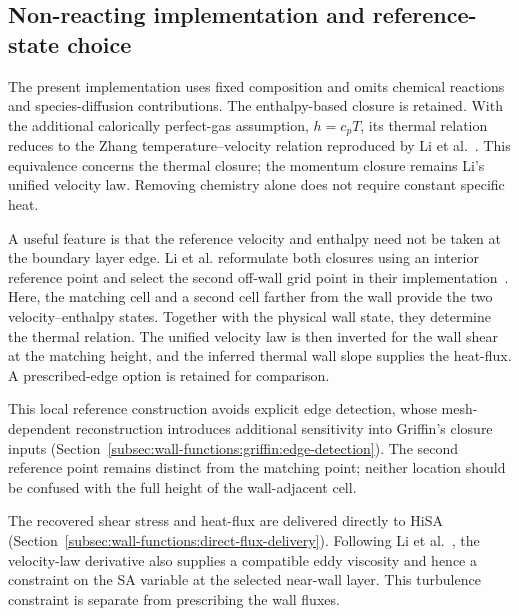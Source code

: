 \subsection{Non-reacting implementation and reference-state choice}
\label{subsec:wall-functions:gao-li:openfoam-implementation}

The present implementation uses fixed composition and omits chemical reactions and species-diffusion contributions. The enthalpy-based closure is retained. With the additional calorically perfect-gas assumption, \(h=c_pT\), its thermal relation reduces to the Zhang temperature--velocity relation reproduced by Li et al.~\cite[Eqs.~(8)--(13)]{li2025WF}. This equivalence concerns the thermal closure; the momentum closure remains Li's unified velocity law. Removing chemistry alone does not require constant specific heat.
\par\medskip

A useful feature is that the reference velocity and enthalpy need not be taken at the boundary layer edge. Li et al. reformulate both closures using an interior reference point and select the second off-wall grid point in their implementation~\cite[Section~IV.C, Eqs.~(40)--(42)]{li2025WF}. Here, the matching cell and a second cell farther from the wall provide the two velocity--enthalpy states. Together with the physical wall state, they determine the thermal relation. The unified velocity law is then inverted for the wall shear at the matching height, and the inferred thermal wall slope supplies the heat-flux. A prescribed-edge option is retained for comparison.
\par\medskip

This local reference construction avoids explicit edge detection, whose mesh-dependent reconstruction introduces additional sensitivity into Griffin's closure inputs (Section~\ref{subsec:wall-functions:griffin:edge-detection}). The second reference point remains distinct from the matching point; neither location should be confused with the full height of the wall-adjacent cell.
\par\medskip

\label{subsec:wall-functions:gao-li:turbulence-coupling}
The recovered shear stress and heat-flux are delivered directly to HiSA (Section~\ref{subsec:wall-functions:direct-flux-delivery}). Following Li et al.~\cite[Eqs.~(36)--(39)]{li2025WF}, the velocity-law derivative also supplies a compatible eddy viscosity and hence a constraint on the SA variable at the selected near-wall layer. This turbulence constraint is separate from prescribing the wall fluxes.
